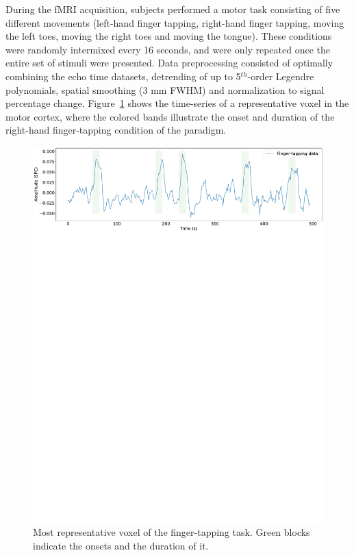 During the fMRI acquisition, subjects performed a motor task consisting of five different movements (left-hand finger tapping, right-hand finger tapping, moving the left toes, moving the right toes and moving the tongue). These conditions were randomly intermixed every 16 seconds, and were only repeated once the entire set of stimuli were presented. Data preprocessing consisted of optimally combining the echo time datasets, detrending of up to 5\(^{th}\)-order Legendre polynomials, spatial smoothing (3 mm FWHM) and normalization to signal percentage change. Figure~\ref{fig:finger_tapping} shows the time-series of a representative voxel in the motor cortex, where the colored bands illustrate the onset and duration of the right-hand finger-tapping condition of the paradigm.

\begin{figure}[h]
    \begin{center}
        \includegraphics[width=\columnwidth]{figures/finger_tapping.pdf}
    \end{center}
    \caption{Most representative voxel of the finger-tapping task. Green blocks indicate the onsets and the duration of it.}
\label{fig:finger_tapping}
\end{figure}

